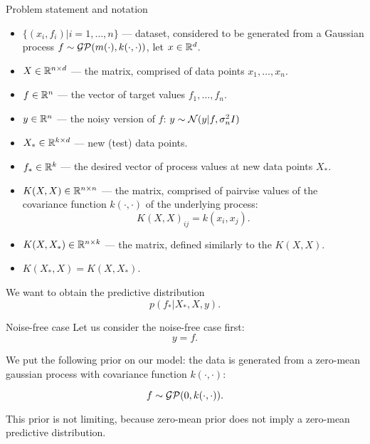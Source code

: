 \begin{frame}{Problem statement and notation}
			\begin{itemize}
				\item $\{(x_i, f_i) | i = 1, \ldots, n\}$ — dataset, considered to be generated from a Gaussian process $f \sim \mathcal{GP}(m(\cdot), k(\cdot, \cdot))$, let $x \in \mathbb{R}^d$. 
				\item $X \in \mathbb{R}^{n \times d}$ — the matrix, comprised of data points $x_1, \ldots, x_n$.
				\item $f \in \mathbb{R}^n$ — the vector of target values $f_1, \ldots, f_n$.

				\item $y \in \mathbb{R}^n$ — the noisy version of $f$: $y \sim \mathcal{N}(y | f, \sigma_n^2 I)$

				\item $X_* \in \mathbb{R}^{k \times d}$ — new (test) data points.

				\item $f_* \in \mathbb{R}^k$ — the desired vector of process values at new data points $X_*$.

				\item $K(X, X) \in \mathbb{R}^{n \times n}$ — the matrix, comprised of pairvise values of the covariance function $k(\cdot, \cdot)$ of the underlying process:
				$$K(X, X)_{ij} = k(x_i, x_j).$$

				\item $K(X, X_*) \in \mathbb{R}^{n \times k}$ — the matrix, defined similarly to the $K(X, X)$.

				\item $K(X_*, X) = K(X, X_*)$.
			\end{itemize}

			\vspace{0.3cm}
			We want to obtain the predictive distribution
			$$p(f_* | X_*, X, y).$$
		\end{frame}

		\begin{frame}{Noise-free case}
			Let us consider the noise-free case first:
			$$y = f.$$

			We put the following prior on our model: the data is generated from a zero-mean gaussian process with covariance function $k(\cdot, \cdot)$:

			$$f \sim \mathcal{GP}(0, k(\cdot, \cdot)).$$

			This prior is not limiting, because zero-mean prior does not imply a zero-mean predictive distribution.

			

		\end{frame}

